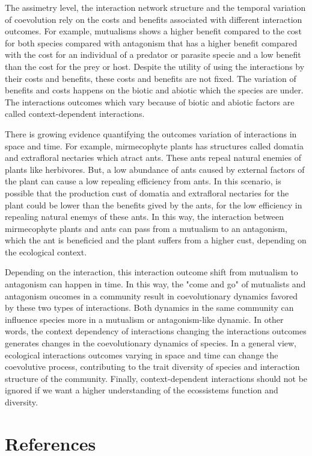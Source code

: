 \documentclass[a4paper, 12pt]{article}
\begin{document}
\par The assimetry level, the interaction network structure and the temporal variation of coevolution rely on the costs and benefits associated with different interaction outcomes.
For example, mutualisms shows a higher benefit compared to the cost for both species compared with antagonism that has a higher benefit compared with the cost for an individual of a predator or parasite specie and a low benefit than the cost for the prey or host.
Despite the utility of using the interactions by their costs and benefits, these costs and benefits are not fixed.
The variation of benefits and costs happens on the biotic and abiotic which the species are under.
The interactions outcomes which vary because of biotic and abiotic factors are called context-dependent interactions.

\par There is growing evidence quantifying the outcomes variation of interactions in space and time.
For example, mirmecophyte plants has structures called domatia and extrafloral nectaries which atract ants. 
These ants repeal natural enemies of plants like herbivores. 
But, a low abundance of ants caused by external factors of the plant can cause a low repealing efficiency from ants. 
In this scenario, is possible that the production cust of domatia and extrafloral nectaries for the plant could be lower than the benefits gived by the ants, for the low efficiency in repealing natural enemys of these ants. 
In this way, the interaction between mirmecophyte plants and ants can pass from a mutualism to an antagonism, which the ant is beneficied and the plant suffers from a higher cust, depending on the ecological context.

\par Depending on the interaction, this interaction outcome shift from mutualism to antagonism can happen in time. 
In this way, the "come and go" of mutualists and antagonism oucomes in a community result in coevolutionary dynamics favored by these two types of interactions. 
Both dynamics in the same community can influence species more in a mutualism or antagonism-like dynamic. 
In other words, the context dependency of interactions changing the interactions outcomes generates changes in the coevolutionary dynamics of species. 
In a general view, ecological interactions outcomes varying in space and time can change the coevolutive process, contributing to the trait diversity of species and interaction structure of the community. 
Finally, context-dependent interactions should not be ignored if we want a higher understanding of the ecossistems function and diversity. 

\section{References}
\end{document}
